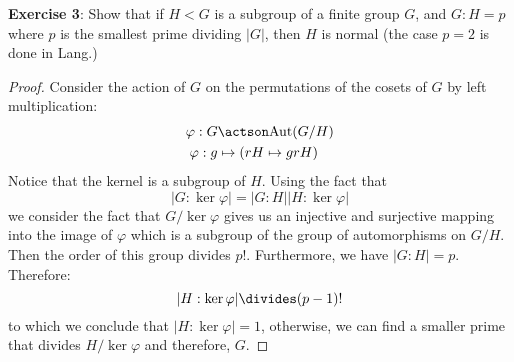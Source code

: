 \documentclass{article}
\begin{document}
\textbf{Exercise 3}: Show that if $H < G$ is a subgroup of a finite group $G$, and $G : H = p$ where $p$ is the smallest prime dividing $\lvert G \rvert$, then $H$ is normal (the case $p = 2$ is done in Lang.)
    \begin{proof}
        Consider the action of $G$ on the permutations of the cosets of $G$ by left multiplication:
            \begin{align*}
                \varphi : G &\actson  \text{Aut}(G/H)  \\
                \varphi : g &\mapsto  (rH \mapsto grH)   
            \end{align*}
        Notice that the kernel is a subgroup of $H$. Using the fact that
            \begin{equation*}
                \lvert G : \ker{\varphi} \rvert = \lvert G : H \rvert \lvert H : \ker{\varphi} \rvert
            \end{equation*}
        we consider the fact that $G/\ker{\varphi}$ gives us an injective and surjective mapping into the image of $\varphi$ which is a subgroup of the group of automorphisms on $G/H$. Then the order of this group divides $p!$. Furthermore, we have $\lvert G : H \rvert = p$. Therefore:
            \begin{equation*}
                \lvert H : \ker{\varphi} \rvert \divides (p - 1)!
            \end{equation*}
        to which we conclude that $\lvert H : \ker{\varphi} \rvert = 1$, otherwise, we can find a smaller prime that divides $H/\ker{\varphi}$ and therefore, $G$.
    \end{proof}
\end{document}
